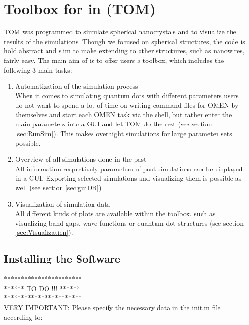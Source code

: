 \chapter{Toolbox for \omen in \matlab (TOM)}

	\gls{TOM} was programmed to simulate spherical nanocrystals and to visualize the results of the simulations.
	Though we focused on spherical structures, the code is hold abstract and slim to make extending to other
	structures, such as nanowires, fairly easy.
	The main aim of \software is to offer \omen users a toolbox, which includes the following 3 main tasks:
	\begin{enumerate}
		\itemsep 0pt
		\item Automatization of the \omen simulation process \\
					When it comes to simulating quantum dots with different parameters users do not want to spend a lot
					of time on writing command files for OMEN by themselves and start each OMEN task via the shell, but 
					rather enter the main parameters into a \gls{GUI} and let \gls{TOM} do the rest (see section \ref{sec:RunSim}).
					This makes overnight simulations for large parameter sets possible.
		\item Overview of all simulations done in the past	\\
					All information respectively parameters of past simulations can be displayed in a \gls{GUI}. Exporting selected
					simulations and visualizing them is possible as well (see section \ref{sec:guiDB})
		\item Visualization of simulation data	\\
					All different kinds of plots are available within the toolbox, such as visualizing band gaps, wave functions or
					quantum dot structures (see section \ref{sec:Visualization}).
	\end{enumerate}

	\section{Installing the Software}
		*********************** \\
		****** TO DO !!! ****** \\
		*********************** \\
		
		VERY IMPORTANT: Please specify the necessary data in the init.m file according to:
		
